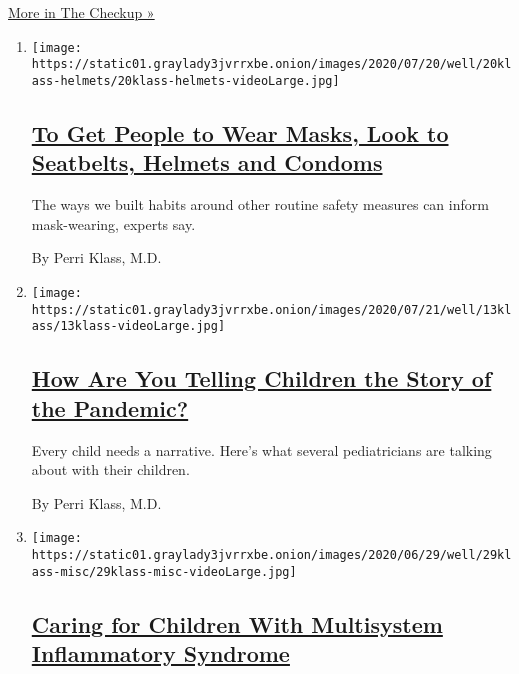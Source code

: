 \href{/column/the-checkup}{More in The Checkup »}

\begin{enumerate}
\def\labelenumi{\arabic{enumi}.}
\item
  \texttt{[image: https://static01.graylady3jvrrxbe.onion/images/2020/07/20/well/20klass-helmets/20klass-helmets-videoLarge.jpg]}

  \hypertarget{to-get-people-to-wear-masks-look-to-seatbelts-helmets-and-condoms}{%
  \subsection{\texorpdfstring{\href{/2020/07/21/well/family/masks-condoms-seatbelts-helmets.html}{To
  Get People to Wear Masks, Look to Seatbelts, Helmets and
  Condoms}}{To Get People to Wear Masks, Look to Seatbelts, Helmets and Condoms}}\label{to-get-people-to-wear-masks-look-to-seatbelts-helmets-and-condoms}}

  The ways we built habits around other routine safety measures can
  inform mask-wearing, experts say.

  By Perri Klass, M.D.
\item
  \texttt{[image: https://static01.graylady3jvrrxbe.onion/images/2020/07/21/well/13klass/13klass-videoLarge.jpg]}

  \hypertarget{how-are-you-telling-children-the-story-of-the-pandemic}{%
  \subsection{\texorpdfstring{\href{/2020/07/14/well/family/children-coronavirus-stories.html}{How
  Are You Telling Children the Story of the
  Pandemic?}}{How Are You Telling Children the Story of the Pandemic?}}\label{how-are-you-telling-children-the-story-of-the-pandemic}}

  Every child needs a narrative. Here's what several pediatricians are
  talking about with their children.

  By Perri Klass, M.D.
\item
  \texttt{[image: https://static01.graylady3jvrrxbe.onion/images/2020/06/29/well/29klass-misc/29klass-misc-videoLarge.jpg]}

  \hypertarget{caring-for-children-with-multisystem-inflammatory-syndrome}{%
  \subsection{\texorpdfstring{\href{/2020/06/29/well/family/caring-for-children-with-multisystem-inflammatory-syndrome.html}{Caring
  for Children With Multisystem Inflammatory
  Syndrome}}{Caring for Children With Multisystem Inflammatory Syndrome}}\label{caring-for-children-with-multisystem-inflammatory-syndrome}}


\end{enumerate}
